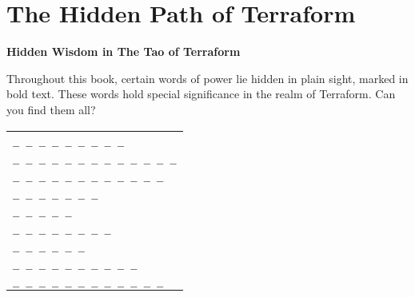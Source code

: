 \chapter*{The Hidden Path of Terraform}

\begin{center}
\large{\textbf{Hidden Wisdom in The Tao of Terraform}}
\end{center}


\noindent Throughout this book, certain words of power lie hidden in plain sight, marked in bold text. These words hold special significance in the realm of Terraform. Can you find them all?


\begin{center}
\begin{tabular}{l}
\texttt{\large{\_  \_  \_  \_  \_  \_  \_  \_  \_}} \\[0.3cm]
\texttt{\large{\_  \_  \_  \_  \_  \_  \_  \_  \_  \_  \_  \_  \_}} \\[0.3cm]
\texttt{\large{\_  \_  \_  \_  \_  \_  \_  \_  \_  \_  \_  \_}} \\[0.3cm]
\texttt{\large{\_  \_  \_  \_  \_  \_  \_}} \\[0.3cm]
\texttt{\large{\_  \_  \_  \_  \_}} \\[0.3cm]
\texttt{\large{\_  \_  \_  \_  \_  \_  \_  \_}} \\[0.3cm]
\texttt{\large{\_  \_  \_  \_  \_  \_}} \\[0.3cm]
\texttt{\large{\_  \_  \_  \_  \_  \_  \_  \_  \_  \_}} \\[0.3cm]
\texttt{\large{\_  \_  \_  \_  \_  \_  \_  \_  \_  \_  \_  \_}} \\[0.3cm]


\end{tabular}
\end{center}


\noindent{}



